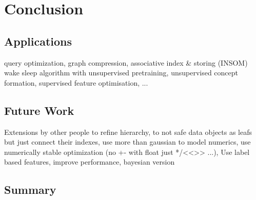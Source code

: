 \chapter{Conclusion}\label{\positionnumber}
\section{Applications}\label{\positionnumber}
query optimization, graph compression, associative index \& storing (INSOM) wake sleep algorithm with unsupervised pretraining, unsupervised concept formation, supervised feature optimisation, ...
\section{Future Work}\label{\positionnumber}
Extensions by other people to refine hierarchy, to not safe data objects as leafs but just connect their indexes, use more than gaussian to model numerics, use numerically stable optimization (no +- with float just */<<>> ...), Use label based features, improve performance, bayesian version

\section{Summary}\label{\positionnumber}

